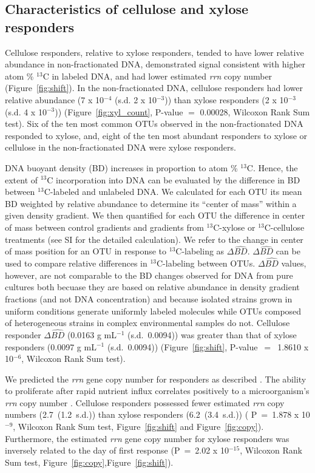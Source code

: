 \subsection{Characteristics of cellulose and xylose responders}
Cellulose responders, relative to xylose responders, tended to have lower
relative abundance in non-fractionated DNA, demonstrated signal consistent with
higher atom \% $^{13}$C in labeled DNA, and had lower estimated \textit{rrn}
copy number (Figure~\ref{fig:shift}). In the non-fractionated DNA, cellulose
responders had lower relative abundance (7 x 10$^{-4}$ (s.d. 2 x 10$^{-3}$)) than
xylose responders (2 x 10$^{-3}$ (s.d. 4 x 10$^{-3}$)) (Figure~\ref{fig:xyl_count},
P-value $=$ 0.00028, Wilcoxon Rank Sum test). Six of the ten most common OTUs
observed in the non-fractionated DNA responded to xylose, and, eight of the ten
most abundant responders to xylose or cellulose in the non-fractionated DNA
were xylose responders.

DNA buoyant density (BD) increases in proportion to atom \% $^{13}$C.
Hence, the extent of $^{13}$C incorporation into DNA can be evaluated by
the difference in BD between $^{13}$C-labeled and unlabeled DNA. We
calculated for each OTU its mean BD weighted by relative abundance to
determine its ``center of mass'' within a given density gradient. We then
quantified for each OTU the difference in center of mass between control
gradients and gradients from $^{13}$C-xylose or $^{13}$C-cellulose
treatments (see SI for the detailed calculation). We refer to the change
in center of mass position for an OTU in response to $^{13}$C-labeling as
$\Delta\hat{BD}$. $\Delta\hat{BD}$ can be used to compare relative
differences in $^{13}$C-labeling between OTUs. $\Delta\hat{BD}$ values,
however, are not comparable to the BD changes observed for DNA from pure
cultures both becuase they are  based on relative
abundance in density gradient fractions (and not DNA concentration) and
because isolated strains grown in uniform conditions generate uniformly
labeled molecules while OTUs composed of heterogeneous strains in complex
environmental samples do not. Cellulose responder $\Delta\hat{BD}$
(0.0163 g mL$^{-1}$ (s.d.~0.0094)) was greater than that of xylose
responders (0.0097 g mL$^{-1}$ (s.d.~0.0094)) (Figure~\ref{fig:shift},
P-value~$=$~1.8610 x 10$^{-6}$, Wilcoxon Rank Sum test). 

We predicted the \textit{rrn} gene copy number for responders as described
\citep{Kembel_2012}. The ability to proliferate after rapid nutrient
influx correlates positively to a microorganism's \textit{rrn} copy number
\citep{Klappenbach_2000}. Cellulose responders possessed fewer estimated
\textit{rrn} copy numbers (2.7~(1.2~s.d.)) than xylose responders
(6.2~(3.4~s.d.)) ( P~=~1.878 x 10$^{-9}$, Wilcoxon Rank Sum test,
Figure~\ref{fig:shift} and Figure~\ref{fig:copy}). Furthermore, the
estimated \textit{rrn} gene copy number for xylose responders was
inversely related to the day of first response (P~=~2.02 x 10$^{-15}$,
Wilcoxon Rank Sum test, Figure~\ref{fig:copy},Figure~\ref{fig:shift}).

